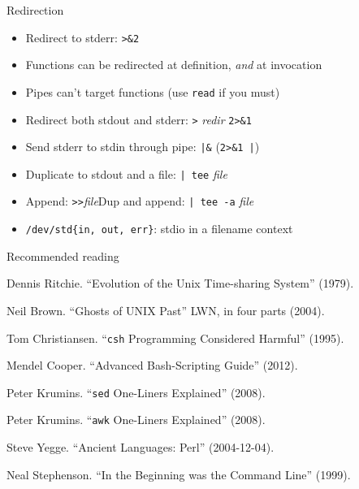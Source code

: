 \documentclass[mathserif,xcolor={dvipsnames,table}]{beamer}
\begin{document}
\begin{frame}{Redirection}
\begin{itemize}
\item Redirect to stderr: \texttt{>\&2}
\item Functions can be redirected at definition, \textit{and} at invocation
\item Pipes can't target functions (use \texttt{read} if you must)
\item Redirect both stdout and stderr: \texttt{>} \textit{redir} \texttt{2>\&1}
\item Send stderr to stdin through pipe: \texttt{|\&} (\texttt{2>\&1 |})
\item Duplicate to stdout and a file: \texttt{| tee} \textit{file}
\item Append: \texttt{>}\texttt{>}\textit{file}\hfill Dup and append: \texttt{| tee -a} \textit{file}
\item \texttt{/dev/std\{in, out, err\}}: stdio in a filename context
\end{itemize}
\end{frame}

\begin{frame}{Recommended reading}
\begin{itemize}
\small{
\item Dennis Ritchie. ``Evolution of the Unix Time-sharing System'' (1979).
\item Neil Brown. ``Ghosts of UNIX Past'' LWN, in four parts (2004).
\item Tom Christiansen. ``\texttt{csh} Programming Considered Harmful'' (1995).
\item Mendel Cooper. ``Advanced Bash-Scripting Guide'' (2012).
\item Peter Krumins. ``\texttt{sed} One-Liners Explained'' (2008).
\item Peter Krumins. ``\texttt{awk} One-Liners Explained'' (2008).
\item Steve Yegge. ``Ancient Languages: Perl'' (2004-12-04).
\item Neal Stephenson. ``In the Beginning was the Command Line'' (1999).
}
\end{itemize}
\end{frame}
\end{document}
